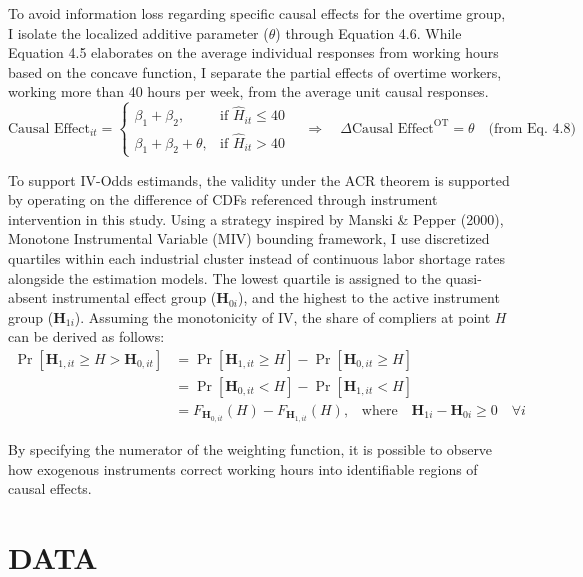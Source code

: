 \documentclass[
  12pt,
]{article}
\begin{document}
To avoid information loss regarding specific causal effects for the
overtime group, I isolate the localized additive parameter (\(\theta\))
through Equation 4.6. While Equation 4.5 elaborates on the average
individual responses from working hours based on the concave function, I
separate the partial effects of overtime workers, working more than 40
hours per week, from the average unit causal responses. \[
\text{Causal Effect}_{it} = 
\begin{cases}
\beta_1 + \beta_2, & \text{if } \hat{H}_{it} \leq 40 \\
\beta_1 + \beta_2 + \theta, & \text{if } \hat{H}_{it} > 40
\end{cases}
\quad \Rightarrow \quad 
\Delta \text{Causal Effect}^{\text{OT}} = \theta \quad \text{(from Eq. 4.8)}
\]

To support IV-Odds estimands, the validity under the ACR theorem is
supported by operating on the difference of CDFs referenced through
instrument intervention in this study. Using a strategy inspired by
Manski \& Pepper (2000), Monotone Instrumental Variable (MIV) bounding
framework, I use discretized quartiles within each industrial cluster
instead of continuous labor shortage rates alongside the estimation
models. The lowest quartile is assigned to the quasi-absent instrumental
effect group (\(\mathbf{H}_{0i}\)), and the highest to the active
instrument group (\(\mathbf{H}_{1i}\)). Assuming the monotonicity of IV,
the share of compliers at point \(H\) can be derived as follows: \[
\begin{aligned}
\Pr[\mathbf{H}_{1,it} \geq H > \mathbf{H}_{0,it}]
&= \Pr[\mathbf{H}_{1,it} \geq H] - \Pr[\mathbf{H}_{0,it} \geq H] \\
&= \Pr[\mathbf{H}_{0,it} < H] - \Pr[\mathbf{H}_{1,it} < H] \\
&= F_{\mathbf{H}_{0,it}}(H) - F_{\mathbf{H}_{1,it}}(H)
\text{,} \quad \text{where} \quad \mathbf{H}_{1i} - \mathbf{H}_{0i} \geq 0 \quad \forall i
\end{aligned}
\]

By specifying the numerator of the weighting function, it is possible to
observe how exogenous instruments correct working hours into
identifiable regions of causal effects.

\newpage

\section{DATA}\label{data}
\end{document}
